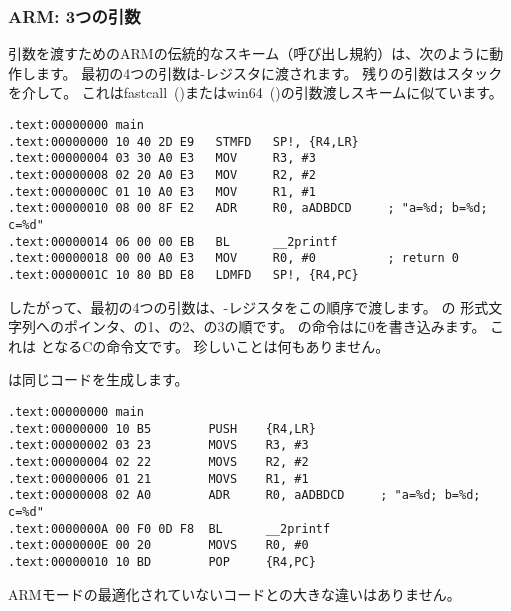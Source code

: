 \subsubsection{ARM: 3つの引数}

引数を渡すためのARMの伝統的なスキーム（呼び出し規約）は、次のように動作します。
最初の4つの引数は-レジスタに渡されます。 残りの引数はスタックを介して。 
これはfastcall~()またはwin64~()の引数渡しスキームに似ています。


\mysubparagraph{\NonOptimizingKeilVI (\ARMMode)}

\begin{lstlisting}[caption=\NonOptimizingKeilVI (\ARMMode),style=customasmARM]
.text:00000000 main
.text:00000000 10 40 2D E9   STMFD   SP!, {R4,LR}
.text:00000004 03 30 A0 E3   MOV     R3, #3
.text:00000008 02 20 A0 E3   MOV     R2, #2
.text:0000000C 01 10 A0 E3   MOV     R1, #1
.text:00000010 08 00 8F E2   ADR     R0, aADBDCD     ; "a=%d; b=%d; c=%d"
.text:00000014 06 00 00 EB   BL      __2printf
.text:00000018 00 00 A0 E3   MOV     R0, #0          ; return 0
.text:0000001C 10 80 BD E8   LDMFD   SP!, {R4,PC}
\end{lstlisting}

したがって、最初の4つの引数は、-レジスタをこの順序で渡します。
の \printf 形式文字列へのポインタ、の1、の2、の3の順です。 
の命令はに0を書き込みます。 これは となるCの命令文です。 
珍しいことは何もありません。

\OptimizingKeilVI は同じコードを生成します。

\mysubparagraph{\OptimizingKeilVI (\ThumbMode)}

\begin{lstlisting}[caption=\OptimizingKeilVI (\ThumbMode),style=customasmARM]
.text:00000000 main
.text:00000000 10 B5        PUSH    {R4,LR}
.text:00000002 03 23        MOVS    R3, #3
.text:00000004 02 22        MOVS    R2, #2
.text:00000006 01 21        MOVS    R1, #1
.text:00000008 02 A0        ADR     R0, aADBDCD     ; "a=%d; b=%d; c=%d"
.text:0000000A 00 F0 0D F8  BL      __2printf
.text:0000000E 00 20        MOVS    R0, #0
.text:00000010 10 BD        POP     {R4,PC}
\end{lstlisting}

ARMモードの最適化されていないコードとの大きな違いはありません。

\label{ARM_B_to_printf}

